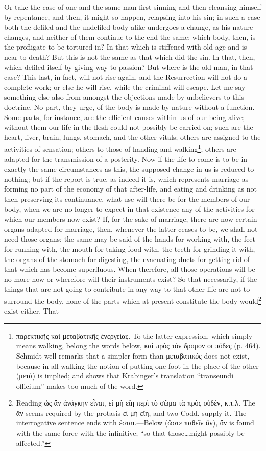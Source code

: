 Or take the case of one and the same man first sinning and then cleansing himself by repentance, and then, it might so happen, relapsing into his sin; in such a case both the defiled and the undefiled body alike undergoes a change, as his nature changes, and neither of them continue to the end the same; which body, then, is the profligate to be tortured in? In that which is stiffened with old age and is near to death? But this is not the same as that which did the sin. In that, then, which defiled itself by giving way to passion? But where is the old man, in that case? This last, in fact, will not rise again, and the Resurrection will not do a complete work; or else he will rise, while the criminal will escape. Let me say something else also from amongst the objections made by unbelievers to this doctrine. No part, they urge, of the body is made by nature without a function. Some parts, for instance, are the efficient causes within us of our being alive; without them our life in the flesh could not possibly be carried on; such are the heart, liver, brain, lungs, stomach, and the other vitals; others are assigned to the activities of sensation; others to those of handing and walking\footnote{\textgreek{παρεκτικῆς καὶ μεταβατικῆς ἐνεργείας}. To the latter expression, which simply means walking, belong the words below, \textgreek{καὶ πρὸς τὸν δρομον οι πόδες} (p. 464). Schmidt well remarks that a simpler form than \textgreek{μεταβατικός} does not exist, because in all walking the notion of putting one foot in the place of the other (\textgreek{μετά}) is implied; and shows that Krabinger’s translation “transeundi officium” makes too much of the word.}; others are adapted for the transmission of a posterity. Now if the life to come is to be in exactly the same circumstances as this, the supposed change in us is reduced to nothing; but if the report is true, as indeed it is, which represents marriage as forming no part of the economy of that after-life, and eating and drinking as not then preserving its continuance, what use will there be for the members of our body, when we are no longer to expect in that existence any of the activities for which our members now exist? If, for the sake of marriage, there are now certain organs adapted for marriage, then, whenever the latter ceases to be, we shall not need those organs: the same may be said of the hands for working with, the feet for running with, the mouth for taking food with, the teeth for grinding it with, the organs of the stomach for digesting, the evacuating ducts for getting rid of that which has become superfluous. When therefore, all those operations will be no more how or wherefore will their instruments exist? So that necessarily, if the things that are not going to contribute in any way to that other life are not to surround the body, none of the parts which at present constitute the body would\footnote{Reading \textgreek{ὡς ἄν ἀνάγκην εἶναι, εἰ μὴ εἴη περὶ τὸ σῶμα τὰ πρὸς οὐδὲν, κ.τ.λ}. The \textgreek{ἂν} seems required by the protasis \textgreek{εἰ μὴ εἴη}, and two Codd. supply it. The interrogative sentence ends with \textgreek{ἔσται}.—Below (\textgreek{ὥστε παθεῖν ἂν}), \textgreek{ἂν} is found with the same force with the infinitive; “so that those…might possibly be affected.”} exist either. That 